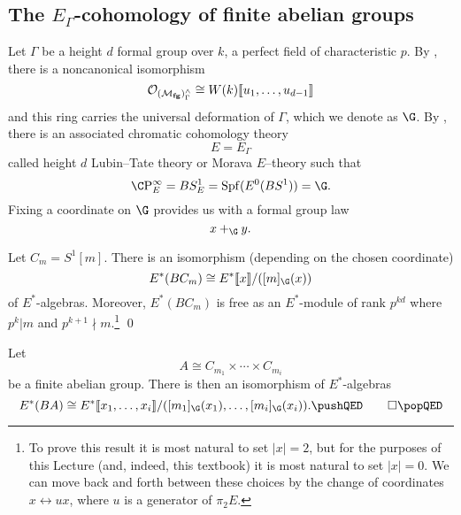 
\subsection*{The \(E_{\Gamma}\)-cohomology of finite abelian groups}



Let \(\Gamma\) be a height \(d\) formal group over \(k\), a perfect field of characteristic \(p\). By , there is a noncanonical isomorphism 
\[
\mathcal{O}_{(\mathcal{M}_{\mathbf{fg}})^\wedge_\Gamma} \cong W(k)\llbracket{u_1, \ldots, u_{d-1}}\rrbracket
\] 
and this ring carries the universal deformation of \(\Gamma\), which we denote as \(\G\). By , there is an associated chromatic cohomology theory
\[
E = E_{\Gamma}
\]
called height \(d\) Lubin--Tate theory or Morava \(E\)--theory such that
\[
\CP^\infty_E = BS^1_E = \Spf(E^0(BS^1)) = \G.
\]
Fixing a coordinate on \(\G\) provides us with a formal group law
\[
x +_{\G} y.
\]

\begin{proposition} \label{app:cyclic}
Let \(C_{m} = S^1[m]\). There is an isomorphism (depending on the chosen coordinate) 
\[
E^*(BC_{m}) \cong E^*\ps{x}/([m]_{\G}(x))
\]
of \(E^*\)-algebras. Moreover, \(E^*(BC_{m})\) is free as an \(E^*\)-module of rank \(p^{kd}\) where \(p^k|m\) and \(p^{k+1} \nmid m\).\footnote{To prove this result it is most natural to set \(|x| = 2\), but for the purposes of this Lecture (and, indeed, this textbook) it is most natural to set \(|x| = 0\). We can move back and forth between these choices by the change of coordinates \(x \leftrightarrow ux\), where \(u\) is a generator of \(\pi_2 E\).} \pushQED\qed \qedhere \popQED
\end{proposition}

\begin{corollary} \label{app:ab}
Let 
\[
A \cong C_{m_1} \times \cdots \times C_{m_i}
\]
be a finite abelian group.  There is then an isomorphism of \(E^*\)-algebras
\[
E^*(BA) \cong E^*\ps{x_1, \ldots, x_{i}}/([m_1]_{\G}(x_1), \ldots, [m_i]_{\G}(x_i)). \pushQED\qed \qedhere \popQED
\]
\end{corollary}


